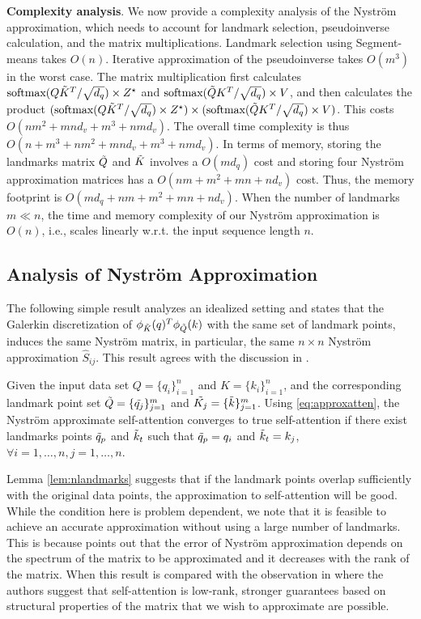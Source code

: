 \smallskip
\textbf{Complexity analysis}. We now provide a complexity analysis of the Nystr\"{o}m approximation, which needs to account for landmark selection, pseudoinverse calculation, and the matrix multiplications. Landmark selection using Segment-means takes $O(n)$. Iterative approximation of the pseudoinverse takes $O(m^3)$ in the worst case. The matrix multiplication first calculates $\text{softmax}(Q\Tilde{K}^T/\sqrt{d_q})\times Z^{\star}$ and $\text{softmax}(\Tilde{Q}K^T/\sqrt{d_q})\times V$, and then calculates the product $(\text{softmax}(Q\Tilde{K}^T/\sqrt{d_q})\times Z^{\star}) \times (\text{softmax}(\Tilde{Q}K^T/\sqrt{d_q})\times V)$. This costs $O(nm^2 + mnd_v + m^3 + nmd_v)$. The overall time complexity is thus $O(n + m^3 + nm^2 + mnd_v + m^3 + nmd_v)$. In terms of memory, storing the landmarks matrix $\Tilde{Q}$ and $\Tilde{K}$ involves a $O(md_q)$ cost and storing four Nystr\"{o}m approximation matrices has a $O(nm + m^2 + mn + nd_v)$ cost. Thus, the memory footprint is $O(md_q + nm + m^2 + mn + nd_v)$. When the number of landmarks $m \ll n$, the time and memory complexity of our Nystr\"{o}m approximation is $O(n)$, i.e., scales linearly w.r.t. the input sequence length $n$.

\subsection{Analysis of Nystr\"{o}m Approximation}

The following simple result analyzes an idealized setting and states that the Galerkin discretization of $\phi_{\Tilde{K}}(q)^T\phi_{\Tilde{Q}}(k)$ with the same set of landmark points, induces the same Nystr\"{o}m matrix, in particular, the same $n\times n$ Nystr\"{o}m approximation $\hat{S}_{ij}$. This result agrees with the discussion in \cite{bremer2012nystrom}.

\begin{lemma}\label{lem:nlandmarks}
Given the input data set $Q = \{q_i\}_{i = 1}^n$ and $K = \{k_i\}_{i = 1}^n$, and the corresponding landmark point set $\Tilde{Q} = \{\Tilde{q_j}\}_{j = 1}^m$ and $\Tilde{K_j} = \{\Tilde{k}\}_{j = 1}^m$. Using \eqref{eq:approxatten}, the Nystr\"{o}m approximate self-attention converges to true self-attention if there exist landmarks points $\Tilde{q}_p$ and $\Tilde{k}_t$ such that $ \Tilde{q}_p = q_i$ and $\Tilde{k}_t = k_j$, $\forall i = 1, \dots, n, j = 1, \dots, n$. 
\end{lemma}

Lemma \ref{lem:nlandmarks} suggests that if the landmark points overlap sufficiently with the original data points, the approximation to self-attention will be good. While the condition here is problem dependent, we note that it is feasible to achieve an accurate approximation without using a large number of landmarks. This is because \cite{oglic2017nystrom} points out that the error of Nystr\"{o}m approximation depends on the spectrum of the matrix to be approximated and it decreases with the rank of the matrix. When this result is compared with the observation in \cite{wang2020linformer} where the authors suggest that self-attention is low-rank, stronger guarantees based on structural properties of the matrix that we wish to approximate are possible. 


